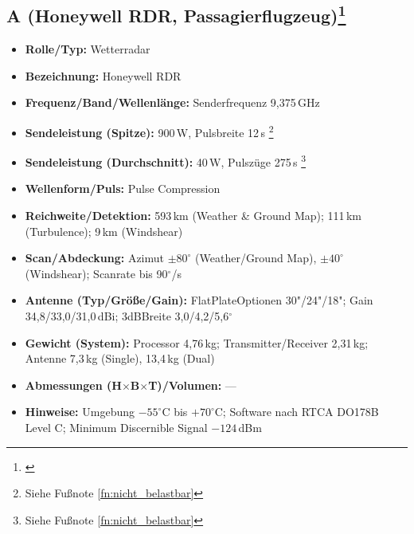 \subsection*{A (Honeywell RDR, Passagierflugzeug)\footnote{ \parencite{Honeywell_RDR4000_Specs}}}
\begin{itemize}
  \item \textbf{Rolle/Typ:} Wetterradar
  \item \textbf{Bezeichnung:} Honeywell RDR
  \item \textbf{Frequenz/Band/Wellenlänge:} Senderfrequenz 9{,}375\,GHz
  \item \textbf{Sendeleistung (Spitze):}  900\,W, Pulsbreite 12\,\textmu s \footnote{Siehe Fußnote \ref{fn:nicht_belastbar}}
  \item \textbf{Sendeleistung (Durchschnitt):}  40\,W, Pulszüge 275\,\textmu s \footnote{Siehe Fußnote \ref{fn:nicht_belastbar}}
  \item \textbf{Wellenform/Puls:} Pulse Compression
  \item \textbf{Reichweite/Detektion:} 593\,km (Weather \& Ground Map); 111\,km (Turbulence); 9\,km (Windshear)
  \item \textbf{Scan/Abdeckung:} Azimut \(\pm 80^\circ\) (Weather/Ground Map), \(\pm 40^\circ\) (Windshear); Scanrate bis 90\(^\circ\)/s
  \item \textbf{Antenne (Typ/Größe/Gain):} Flat\-Plate\-Optionen 30"/24"/18"; Gain 34{,}8/33{,}0/31{,}0\,dBi; 3\-dB\-Breite 3{,}0/4{,}2/5{,}6\(^\circ\)
  \item \textbf{Gewicht (System):} Processor 4{,}76\,kg; Transmitter/Receiver 2{,}31\,kg; Antenne 7{,}3\,kg (Single), 13{,}4\,kg (Dual)
  \item \textbf{Abmessungen (H\(\times\)B\(\times\)T)/Volumen:} ---
  \item \textbf{Hinweise:} Umgebung \(-55^\circ\)C bis \(+70^\circ\)C; Software nach RTCA DO\-178B Level C; Minimum Discernible Signal \(-124\)\,dBm
\end{itemize}

